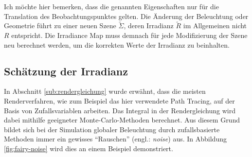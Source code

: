 		Ich möchte hier bemerken, dass die genannten Eigenschaften nur für die Translation des Beobachtungspunktes gelten.
		Die Änderung der Beleuchtung oder Geometrie führt zu einer neuen Szene $\tilde{\Sigma}$, deren Irradianz $\tilde{R}$ im Allgemeinen nicht $R$ entspricht.
		Die Irradiance Map muss demnach für jede Modifizierung der Szene neu berechnet werden, um die korrekten Werte der Irradianz zu beinhalten.


	\subsection{Schätzung der Irradianz} %
	\label{sub:schaetzung_der_irradianz}

		In Abschnitt \ref{sub:rendergleichung} wurde erwähnt, dass die meisten Renderverfahren, wie zum Beispiel das hier verwendete Path Tracing, auf der Basis von Zufallsvariablen arbeiten.
		Das Integral in der Rendergleichung wird dabei mithilfe geeigneter Monte-Carlo-Methoden berechnet.
		Aus diesem Grund bildet sich bei der Simulation globaler Beleuchtung durch zufallsbasierte Methoden immer ein gewisses \enquote{Rauschen} (engl.: \textit{noise}) aus.
		In Abbildung \ref{fig:fairy-noise} wird dies an einem Beispiel demonstriert.

